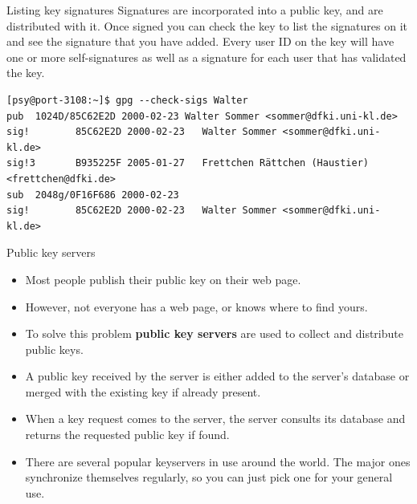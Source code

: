 \documentclass[%
mode=present,%
paper=screen%
]{powerdot}
\begin{document}
\begin{slide}[method=direct]{Listing key signatures}
  Signatures are incorporated into a public key, and are distributed
  with it.  Once signed you can check the key to list the signatures
  on it and see the signature that you have added. Every user ID on
  the key will have one or more self-signatures as well as a signature
  for each user that has validated the key.\\[1ex]

\begin{verbatim}
[psy@port-3108:~]$ gpg --check-sigs Walter
pub  1024D/85C62E2D 2000-02-23 Walter Sommer <sommer@dfki.uni-kl.de>
sig!        85C62E2D 2000-02-23   Walter Sommer <sommer@dfki.uni-kl.de>
sig!3       B935225F 2005-01-27   Frettchen Rättchen (Haustier) <frettchen@dfki.de>
sub  2048g/0F16F686 2000-02-23
sig!        85C62E2D 2000-02-23   Walter Sommer <sommer@dfki.uni-kl.de>
\end{verbatim}%
\end{slide}

\begin{slide}{Public key servers}
  \begin{itemize}
  \item Most people publish their public key on their web page.
  \item However, not everyone has a web page, or knows where to find
    yours.
  \item To solve this problem \textbf{public key servers} are used to
    collect and distribute public keys.
  \item A public key received by the server is either added to the
    server's database or merged with the existing key if already
    present.
  \item When a key request comes to the server, the server consults
    its database and returns the requested public key if found.
  \item There are several popular keyservers in use around the world.
    The major ones synchronize themselves regularly, so you can just
    pick one for your general use.
  \end{itemize}
\end{slide}
\end{document}
